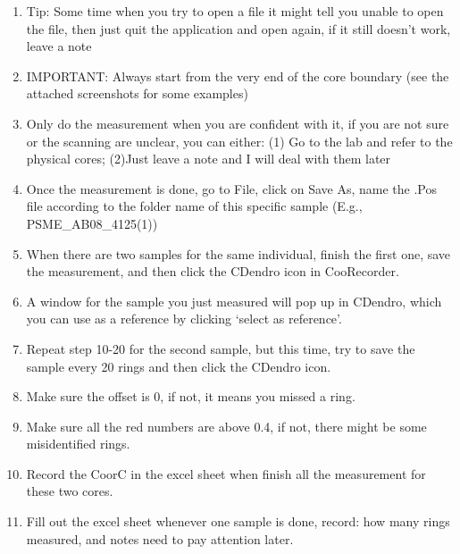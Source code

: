 \documentclass[11pt,letter]{article}
\begin{document}
\begin{enumerate}
\item Tip: Some time when you try to open a file it might tell you unable to open the file, then just quit the application and open again, if it still doesn't work, leave a note
\item IMPORTANT: Always start from the very end of the core boundary (see the attached screenshots for some examples)
\item Only do the measurement when you are confident with it, if you are not sure or the scanning are unclear, you can either: (1) Go to the lab and refer to the physical cores; (2)Just leave a note and I will deal with them later
\item Once the measurement is done, go to File, click on Save As, name the .Pos file according to the folder name of this specific sample (E.g., PSME\_AB08\_4125(1))
\item When there are two samples for the same individual, finish the first one, save the measurement, and then click the CDendro icon in CooRecorder.
\item A window for the sample you just measured will pop up in CDendro, which you can use as a reference by clicking `select as reference'.
\item Repeat step 10-20 for the second sample, but this time, try to save the sample every 20 rings and then click the CDendro icon.
\item Make sure the offset is 0, if not, it means you missed a ring.
\item Make sure all the red numbers are above 0.4, if not, there might be some misidentified rings.
\item Record the CoorC in the excel sheet when finish all the measurement for these two cores.
\item Fill out the excel sheet whenever one sample is done, record: how many rings measured, and notes need to pay attention later.
	\end{enumerate}
\end{document}
